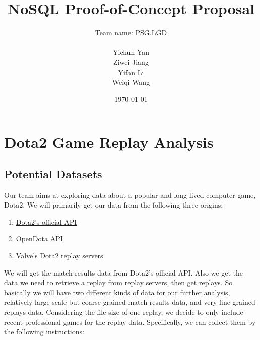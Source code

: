 \documentclass{article}
\title{NoSQL Proof-of-Concept Proposal}
\author{
	Team name: PSG.LGD \\ \\
	Yichun Yan \\
	Ziwei Jiang \\
	Yifan Li \\
	Weiqi Wang
}
\date{\today}
\begin{document}
\maketitle

\tableofcontents
\clearpage


\section{Dota2 Game Replay Analysis}
\subsection{Potential Datasets}
Our team aims at exploring data about a popular and long-lived computer game, Dota2. We will primarily get our data from the following three origins:

\begin{enumerate}
\item \href{https://wiki.teamfortress.com/wiki/WebAPI}{Dota2's official API}
\item \href{https://docs.opendota.com/}{OpenDota API}
\item Valve's Dota2 replay servers
\end{enumerate}

We will get the match results data from Dota2's official API. Also we get the data we need to retrieve a replay from replay servers, then get replays. So basically we will have two different kinds of data for our further analysis, relatively large-scale but coarse-grained match results data, and very fine-grained replays data. Considering the file size of one replay, we decide to only include recent professional games for the replay data. Specifically, we can collect them by the following instructions:
\end{document}
